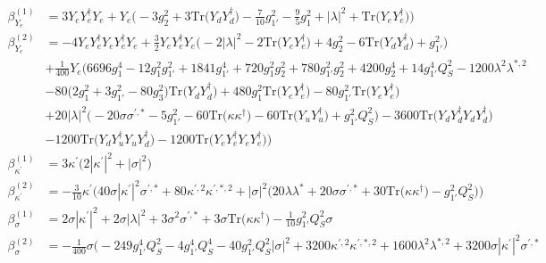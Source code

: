 {\begin{align}
\beta_{Y_e}^{(1)} & =  
3 {Y_e  Y_{e}^{\dagger}  Y_e}  + Y_e \Big(-3 g_{2}^{2}  + 3 \mbox{Tr}\Big({Y_d  Y_{d}^{\dagger}}\Big)  -\frac{7}{10} g_{1'}^{2}  -\frac{9}{5} g_{1}^{2}  + |\lambda|^2 + \mbox{Tr}\Big({Y_e  Y_{e}^{\dagger}}\Big)\Big)\\ 
\beta_{Y_e}^{(2)} & =  
-4 {Y_e  Y_{e}^{\dagger}  Y_e  Y_{e}^{\dagger}  Y_e} +\frac{3}{2} {Y_e  Y_{e}^{\dagger}  Y_e} \Big(-2 |\lambda|^2  -2 \mbox{Tr}\Big({Y_e  Y_{e}^{\dagger}}\Big)  + 4 g_{2}^{2}  -6 \mbox{Tr}\Big({Y_d  Y_{d}^{\dagger}}\Big)  + g_{1'}^{2}\Big)\nonumber \\ 
 &+\frac{1}{400} Y_e \Big(6696 g_{1}^{4} -12 g_{1}^{2} g_{1'}^{2} +1841 g_{1'}^{4} +720 g_{1}^{2} g_{2}^{2} +780 g_{1'}^{2} g_{2}^{2} +4200 g_{2}^{4} +14 g_{1'}^{4} Q_{S}^{2} -1200 \lambda^{2} \lambda^{*,2} \nonumber \\ 
 &-80 \Big(2 g_{1}^{2}  + 3 g_{1'}^{2}  -80 g_{3}^{2} \Big)\mbox{Tr}\Big({Y_d  Y_{d}^{\dagger}}\Big) +480 g_{1}^{2} \mbox{Tr}\Big({Y_e  Y_{e}^{\dagger}}\Big) -80 g_{1'}^{2} \mbox{Tr}\Big({Y_e  Y_{e}^{\dagger}}\Big) \nonumber \\ 
 &+20 |\lambda|^2 \Big(-20 \sigma \sigma^{\prime,*}  -5 g_{1'}^{2}  -60 \mbox{Tr}\Big({\kappa  \kappa^{\dagger}}\Big)  -60 \mbox{Tr}\Big({Y_u  Y_{u}^{\dagger}}\Big)  + g_{1'}^{2} Q_{S}^{2} \Big)-3600 \mbox{Tr}\Big({Y_d  Y_{d}^{\dagger}  Y_d  Y_{d}^{\dagger}}\Big) \nonumber \\ 
 &-1200 \mbox{Tr}\Big({Y_d  Y_{u}^{\dagger}  Y_u  Y_{d}^{\dagger}}\Big) -1200 \mbox{Tr}\Big({Y_e  Y_{e}^{\dagger}  Y_e  Y_{e}^{\dagger}}\Big) \Big)\\ 
\beta_{\kappa^\prime}^{(1)} & =  
3 \kappa^\prime \Big(2 |\kappa^\prime|^2  + |\sigma|^2\Big)\\ 
\beta_{\kappa^\prime}^{(2)} & =  
-\frac{3}{10} \kappa^\prime \Big(40 \sigma |\kappa^\prime|^2 \sigma^{\prime,*}  + 80 \kappa^{\prime,2} \kappa^{\prime,*,2}  + |\sigma|^2 \Big(20 \lambda \lambda^*  + 20 \sigma \sigma^{\prime,*}  + 30 \mbox{Tr}\Big({\kappa  \kappa^{\dagger}}\Big)  - g_{1'}^{2} Q_{S}^{2} \Big)\Big)\\ 
\beta_{\sigma}^{(1)} & =  
2 \sigma |\kappa^\prime|^2  + 2 \sigma |\lambda|^2  + 3 \sigma^{2} \sigma^{\prime,*}  + 3 \sigma \mbox{Tr}\Big({\kappa  \kappa^{\dagger}}\Big)  -\frac{1}{10} g_{1'}^{2} Q_{S}^{2} \sigma \\ 
\beta_{\sigma}^{(2)} & =  
-\frac{1}{400} \sigma \Big(-249 g_{1'}^{4} Q_{S}^{2} -4 g_{1'}^{4} Q_{S}^{4} -40 g_{1'}^{2} Q_{S}^{2} |\sigma|^2 +3200 \kappa^{\prime,2} \kappa^{\prime,*,2} +1600 \lambda^{2} \lambda^{*,2} +3200 \sigma |\kappa^\prime|^2 \sigma^{\prime,*} \nonumber \\ 

\end{align}}
